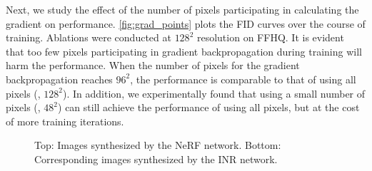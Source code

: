 \documentclass[10pt,twocolumn,letterpaper]{article}
\begin{document}
Next, we study the effect of the number of pixels participating in calculating the gradient on performance. \cref{fig:grad_points} plots the FID curves over the course of training. Ablations were conducted at $128^2$ resolution on FFHQ. It is evident that too few pixels participating in gradient backpropagation during training will harm the performance. When the number of pixels for the gradient backpropagation reaches $96^2$, the performance is comparable to that of using all pixels (\ie, $128^2$). In addition, we experimentally found that using a small number of pixels (\eg, $48^2$) can still achieve the performance of using all pixels, but at the cost of more training iterations.



\begin{figure}[!t]
  \footnotesize
  \centering
  \renewcommand{\tabcolsep}{5pt} \renewcommand{\arraystretch}{0}
  \vspace{-0.3cm}
  \caption{Top: Images synthesized by the NeRF network. Bottom: Corresponding images synthesized by the INR network. }
  \label{fig:nerf_inr_imgs}
  \vspace{-0.5cm}
\end{figure}
\end{document}
